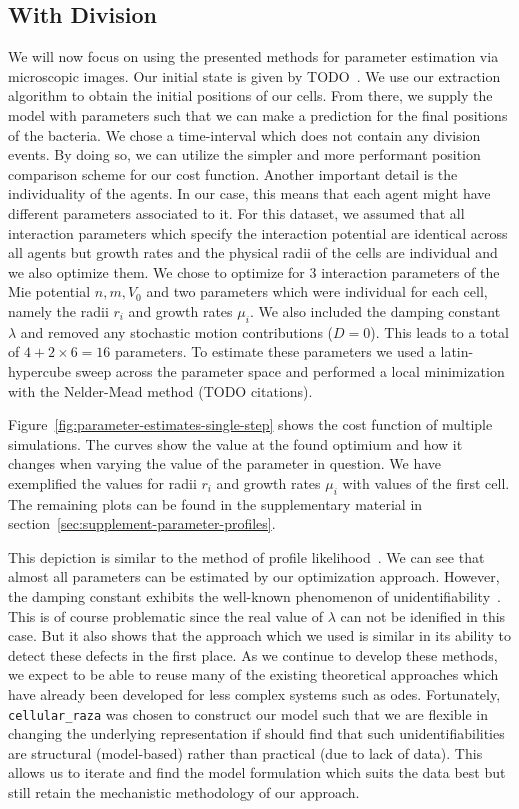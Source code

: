 \documentclass{article}
\begin{document}
\subsection{With Division}
We will now focus on using the presented methods for parameter estimation via microscopic images.
Our initial state is given by TODO~\cite{}.%
We use our extraction algorithm to obtain the initial positions of our cells.
From there, we supply the model with parameters such that we can make a prediction for the final
positions of the bacteria.
We chose a time-interval which does not contain any division events.
By doing so, we can utilize the simpler and more performant position comparison scheme for our cost
function.
Another important detail is the individuality of the agents.
In our case, this means that each agent might have different parameters associated to it.
For this dataset, we assumed that all interaction parameters which specify the interaction
potential are identical across all agents but growth rates and the physical radii of the cells are
individual and we also optimize them.
We chose to optimize for 3 interaction parameters of the Mie potential $n,m,V_0$ and two parameters
which were individual for each cell, namely the radii $r_i$ and growth rates $\mu_i$.
We also included the damping constant $\lambda$ and removed any stochastic motion contributions
($D=0$).
This leads to a total of $4+2\times 6=16$ parameters.
To estimate these parameters we used a latin-hypercube sweep across the parameter space and
performed a local minimization with the Nelder-Mead method (TODO citations).%

Figure~\ref{fig:parameter-estimates-single-step} shows the cost function of multiple simulations.
The curves show the value at the found optimium and how it changes when varying the value of the
parameter in question.
We have exemplified the values for radii $r_i$ and growth rates $\mu_i$ with values of the first
cell.
The remaining plots can be found in the supplementary material in
section~\ref{sec:supplement-parameter-profiles}.

This depiction is similar to the method of profile likelihood~\cite{Raue2009}.
We can see that almost all parameters can be estimated by our optimization approach.
However, the damping constant exhibits the well-known phenomenon of
unidentifiability~\cite{Raue2009}.
This is of course problematic since the real value of $\lambda$ can not be idenified in this case.
But it also shows that the approach which we used is similar in its ability to detect these defects
in the first place.
As we continue to develop these methods, we expect to be able to reuse many of the existing
theoretical approaches which have already been developed for less complex systems such as \acp{ode}.
Fortunately, \texttt{cellular\_raza} was chosen to construct our model such that we are flexible in
changing the underlying representation if should find that such unidentifiabilities are structural
(model-based) rather than practical (due to lack of data).
This allows us to iterate and find the model formulation which suits the data best but still retain
the mechanistic methodology of our approach.
\end{document}
